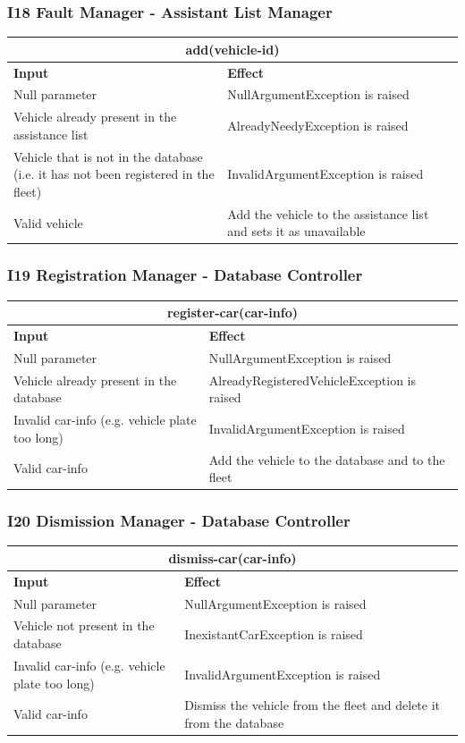 \documentclass{article}
\begin{document}
\subsubsection{I18 Fault Manager - Assistant List Manager}
\begin{tabular}{ |p{5cm}|p{7cm}| }
  \hline
  \multicolumn{2}{|c|}{add(vehicle-id)} \\
  \hline
  \textbf{Input} & \textbf{Effect} \\
  \hline
  Null parameter & NullArgumentException is raised\\
  \hline
  Vehicle already present in the assistance list & AlreadyNeedyException is raised\\
  \hline
  Vehicle that is not in the database (i.e. it has not been registered in the fleet) & InvalidArgumentException is raised\\
  \hline
  Valid vehicle & Add the vehicle to the assistance list and sets it as unavailable\\
  \hline
\end{tabular}
\subsubsection{I19 Registration Manager - Database Controller }
\begin{tabular}{ |p{5cm}|p{7cm}| }
  \hline
  \multicolumn{2}{|c|}{register-car(car-info)} \\
  \hline
  \textbf{Input} & \textbf{Effect} \\
  \hline
  Null parameter & NullArgumentException is raised\\
  \hline
  Vehicle already present in the database & AlreadyRegisteredVehicleException is raised\\
  \hline
  Invalid car-info (e.g. vehicle plate too long) & InvalidArgumentException is raised\\
  \hline
  Valid car-info & Add the vehicle to the database and to the fleet\\
  \hline
\end{tabular}
\subsubsection{I20 Dismission Manager - Database Controller }
\begin{tabular}{ |p{5cm}|p{7cm}| }
  \hline
  \multicolumn{2}{|c|}{dismiss-car(car-info)} \\
  \hline
  \textbf{Input} & \textbf{Effect} \\
  \hline
  Null parameter & NullArgumentException is raised\\
  \hline
  Vehicle not present in the database & InexistantCarException is raised\\
  \hline
  Invalid car-info (e.g. vehicle plate too long) & InvalidArgumentException is raised\\
  \hline
  Valid car-info & Dismiss the vehicle from the fleet and delete it from the database\\
  \hline
\end{tabular}
\end{document}
